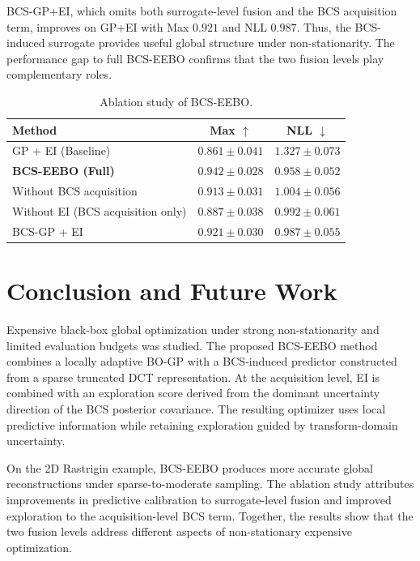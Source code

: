 \documentclass[lettersize,journal]{IEEEtran}
\begin{document}
BCS-GP+EI, which omits both surrogate-level fusion and the BCS acquisition term, improves on GP+EI with Max $0.921$ and NLL $0.987$. Thus, the BCS-induced surrogate provides useful global structure under non-stationarity. The performance gap to full BCS-EEBO confirms that the two fusion levels play complementary roles.

\begin{table}[t]
\centering
\caption{Ablation study of BCS-EEBO.}
\label{tab:ablation}
\setlength{\tabcolsep}{4.5pt}
\begin{tabular}{lcc}
\hline
\textbf{Method} & \textbf{Max} $\uparrow$ & \textbf{NLL} $\downarrow$ \\
\hline
GP + EI (Baseline) & $0.861 \pm 0.041$ & $1.327 \pm 0.073$ \\
\textbf{BCS-EEBO (Full)} & $\mathbf{0.942 \pm 0.028}$ & $\mathbf{0.958 \pm 0.052}$ \\
Without BCS acquisition  & $0.913 \pm 0.031$ & $1.004 \pm 0.056$ \\
Without EI (BCS acquisition only) & $0.887 \pm 0.038$ & $0.992 \pm 0.061$ \\
BCS-GP + EI  & $0.921 \pm 0.030$ & $0.987 \pm 0.055$ \\
\hline
\end{tabular}
\end{table}

\section{Conclusion and Future Work}
\label{sec:conclusion}

Expensive black-box global optimization under strong non-stationarity and limited evaluation budgets was studied. The proposed BCS-EEBO method combines a locally adaptive BO-GP with a BCS-induced predictor constructed from a sparse truncated DCT representation. At the acquisition level, EI is combined with an exploration score derived from the dominant uncertainty direction of the BCS posterior covariance. The resulting optimizer uses local predictive information while retaining exploration guided by transform-domain uncertainty.

On the 2D Rastrigin example, BCS-EEBO produces more accurate global reconstructions under sparse-to-moderate sampling. The ablation study attributes improvements in predictive calibration to surrogate-level fusion and improved exploration to the acquisition-level BCS term. Together, the results show that the two fusion levels address different aspects of non-stationary expensive optimization.
\end{document}
